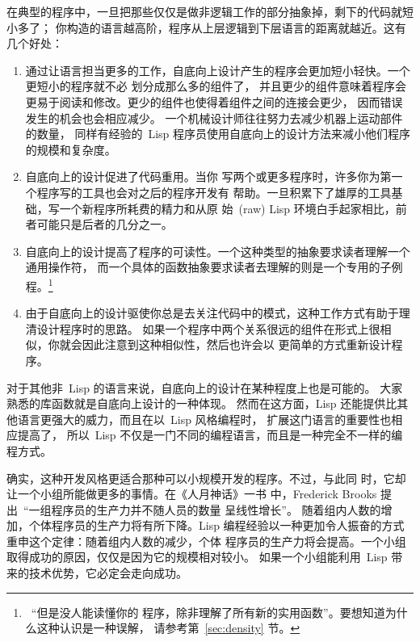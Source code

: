 在典型的程序中，一旦把那些仅仅是做非逻辑工作的部分抽象掉，剩下的代码就短小多了；
你构造的语言越高阶，程序从上层逻辑到下层语言的距离就越近。这有几个好处：
\begin{enumerate}
\item
  通过让语言担当更多的工作，自底向上设计产生的程序会更加短小轻快。一个更短小的程序就不必
  划分成那么多的组件了，
  并且更少的组件意味着程序会更易于阅读和修改。更少的组件也使得着组件之间的连接会更少，
  因而错误发生的机会也会相应减少。
  一个机械设计师往往努力去减少机器上运动部件的数量，
  同样有经验的~Lisp 程序员使用自底向上的设计方法来减小他们程序的规模和复杂度。
\item
  自底向上的设计促进了代码重用。当你
  写两个或更多程序时，许多你为第一个程序写的工具也会对之后的程序开发有
  帮助。一旦积累下了雄厚的工具基础，写一个新程序所耗费的精力和从原
  始~(raw) Lisp 环境白手起家相比，前者可能只是后者的几分之一。
\item
  自底向上的设计提高了程序的可读性。一个这种类型的抽象要求读者理解一个通用操作符，
  而一个具体的函数抽象要求读者去理解的则是一个专用的子例程。\footnote{~``但是没人能读懂你的
    程序，除非理解了所有新的实用函数''。要想知道为什么这种认识是一种误解，
    请参考第~\ref{sec:density} 节。}
\item
  由于自底向上的设计驱使你总是去关注代码中的模式，这种工作方式有助于理清设计程序时的思路。
  如果一个程序中两个关系很远的组件在形式上很相似，你就会因此注意到这种相似性，然后也许会以
  更简单的方式重新设计程序。
\end{enumerate}
对于其他非~Lisp 的语言来说，自底向上的设计在某种程度上也是可能的。
大家熟悉的库函数就是自底向上设计的一种体现。
然而在这方面，Lisp 还能提供比其他语言更强大的威力，而且在以~Lisp 风格编程时，
扩展这门语言的重要性也相应提高了，
所以~Lisp 不仅是一门不同的编程语言，而且是一种完全不一样的编程方式。

确实，这种开发风格更适合那种可以小规模开发的程序。不过，与此同
时，它却让一个小组所能做更多的事情。在《人月神话》一书
中，Frederick Brooks 提出~``一组程序员的生产力并不随人员的数量
呈线性增长''。
随着组内人数的增加，个体程序员的生产力将有所下降。Lisp
编程经验以一种更加令人振奋的方式重申这个定律：随着组内人数的减少，个体
程序员的生产力将会提高。一个小组取得成功的原因，仅仅是因为它的规模相对较小。
如果一个小组能利用~Lisp 带来的技术优势，它必定会走向成功。

